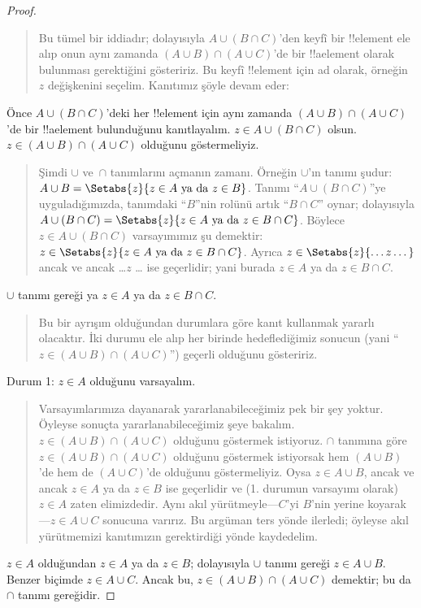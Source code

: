 \documentclass[../../../include/open-logic-section]{subfiles}
\begin{document}
\begin{proof}
\begin{quote}
Bu tümel bir iddiadır; dolayısıyla $A \cup (B \cap C)$'den keyfî bir
!!{element} ele alıp onun aynı zamanda $(A \cup B) \cap (A \cup
C)$'de bir !!a{element} olarak bulunması gerektiğini gösteririz. Bu keyfî
!!{element} için ad olarak, örneğin~$z$ değişkenini seçelim.
Kanıtımız şöyle devam eder:
\end{quote}
Önce $A \cup (B \cap C)$'deki her !!{element} için aynı zamanda $(A \cup
B) \cap (A \cup C)$'de bir !!a{element} bulunduğunu kanıtlayalım. $z
\in A \cup (B \cap C)$ olsun. $z \in (A \cup B) \cap (A \cup C)$
olduğunu göstermeliyiz.
\begin{quote}
Şimdi $\cup$ ve~$\cap$ tanımlarını açmanın zamanı. Örneğin $\cup$'ın
tanımı şudur: $A \cup B = \Setabs{z}{z \in A \text{ ya da } z \in B}$.
Tanımı ``$A \cup (B \cap C)$''ye uyguladığımızda, tanımdaki ``$B$''nin
rolünü artık ``$B \cap C$'' oynar; dolayısıyla $A \cup (B \cap C) =
\Setabs{z}{z \in A \text{ ya da } z \in B \cap C}$. Böylece $z \in A
\cup (B \cap C)$ varsayımımız şu demektir: $z \in \Setabs{z}{z \in A
\text{ ya da } z \in B \cap C}$. Ayrıca $z \in
\Setabs{z}{\dots z\dots}$ ancak ve ancak \dots $z$ \dots{} ise
geçerlidir; yani burada $z \in A$ ya da $z \in B \cap C$.
\end{quote}
$\cup$ tanımı gereği ya $z \in A$ ya da $z \in B \cap C$.
\begin{quote}
Bu bir ayrışım olduğundan durumlara göre kanıt kullanmak yararlı
olacaktır. İki durumu ele alıp her birinde hedeflediğimiz sonucun (yani
``$z \in (A \cup B) \cap (A \cup C)$'') geçerli olduğunu gösteririz.
\end{quote}
Durum 1: $z \in A$ olduğunu varsayalım.
\begin{quote}
Varsayımlarımıza dayanarak yararlanabileceğimiz pek bir şey yoktur.
Öyleyse sonuçta yararlanabileceğimiz şeye bakalım. $z \in (A \cup B)
\cap (A \cup C)$ olduğunu göstermek istiyoruz. $\cap$ tanımına göre $z
\in (A \cup B) \cap (A \cup C)$ olduğunu göstermek istiyorsak hem $(A
\cup B)$'de hem de $(A \cup C)$'de olduğunu göstermeliyiz. Oysa $z \in
A \cup B$, ancak ve ancak $z \in A$ ya da $z \in B$ ise geçerlidir ve
  (1. durumun varsayımı olarak) $z \in A$ zaten elimizdedir. Aynı akıl
  yürütmeyle---$C$'yi $B$'nin yerine koyarak---$z \in A \cup C$ sonucuna varırız.
Bu argüman ters yönde ilerledi; öyleyse akıl yürütmemizi kanıtımızın
gerektirdiği yönde kaydedelim.
\end{quote}
$z \in A$ olduğundan $z \in A$ ya da $z \in B$; dolayısıyla $\cup$
tanımı gereği $z \in A \cup B$. Benzer biçimde $z \in A \cup C$. Ancak
bu, $z \in (A \cup B) \cap (A \cup C)$ demektir; bu da $\cap$ tanımı gereğidir.

\end{proof}
\end{document}
